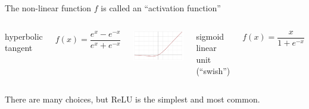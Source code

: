 \documentclass[aspectratio=169]{beamer}
\begin{document}
\begin{frame}{The non-linear function $f$ is called an ``activation function''}
\begin{columns}
hyperbolic tangent

\vspace{-\baselineskip}
\[ f(x) = \frac{e^x - e^{-x}}{e^x + e^{-x}} \]

\includegraphics[width=\linewidth]{img/Activation_swish.pdf}

sigmoid linear unit (``swish'')

\[ f(x) = \frac{x}{1 + e^{-x}} \]
\end{columns}

\large

\vspace{0.75 cm}
There are many choices, but ReLU is the simplest and most common.
\end{frame}
\end{document}
